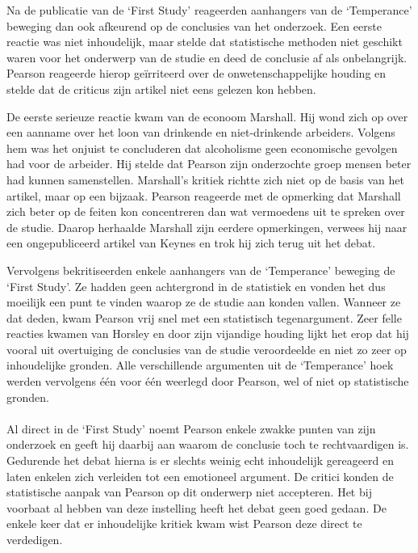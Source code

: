 \documentclass[a4paper,11pt]{article}
\begin{document}
Na de publicatie van de `First Study' reageerden aanhangers van de
`Temperance' beweging dan ook afkeurend op de conclusies van het
onderzoek. Een eerste reactie was niet inhoudelijk, maar stelde dat
statistische methoden niet geschikt waren voor het onderwerp van de studie en
deed de conclusie af als onbelangrijk. Pearson reageerde hierop ge\"irriteerd
over de onwetenschappelijke houding en stelde dat de criticus zijn artikel
niet eens gelezen kon hebben.

De eerste serieuze reactie kwam van de econoom Marshall. Hij wond zich op over
een aanname over het loon van drinkende en niet-drinkende arbeiders. Volgens
hem was het onjuist te concluderen dat alcoholisme geen economische gevolgen
had voor de arbeider. Hij stelde dat Pearson zijn onderzochte groep mensen
beter had kunnen samenstellen. Marshall's kritiek richtte zich niet op de
basis van het artikel, maar op een bijzaak. Pearson reageerde met de opmerking
dat Marshall zich beter op de feiten kon concentreren dan wat vermoedens uit
te spreken over de studie. Daarop herhaalde Marshall zijn eerdere opmerkingen,
verwees hij naar een ongepubliceerd artikel van Keynes en trok hij zich terug
uit het debat.

Vervolgens bekritiseerden enkele aanhangers van de `Temperance' beweging de
`First Study'. Ze hadden geen achtergrond in de statistiek en vonden het dus
moeilijk een punt te vinden waarop ze de studie aan konden vallen. Wanneer ze
dat deden, kwam Pearson vrij snel met een statistisch tegenargument. Zeer
felle reacties kwamen van Horsley en door zijn vijandige houding lijkt het
erop dat hij vooral uit overtuiging de conclusies van de studie veroordeelde
en niet zo zeer op inhoudelijke gronden. Alle verschillende argumenten uit de
`Temperance' hoek werden vervolgens \'e\'en voor \'e\'en weerlegd door
Pearson, wel of niet op statistische gronden.

\paragraph{}

Al direct in de `First Study' noemt Pearson enkele zwakke punten van zijn
onderzoek en geeft hij daarbij aan waarom de conclusie toch te rechtvaardigen
is. Gedurende het debat hierna is er slechts weinig echt inhoudelijk
gereageerd en laten enkelen zich verleiden tot een emotioneel argument. De
critici konden de statistische aanpak van Pearson op dit onderwerp niet
accepteren. Het bij voorbaat al hebben van deze instelling heeft het debat
geen goed gedaan. De enkele keer dat er inhoudelijke kritiek kwam wist Pearson
deze direct te verdedigen.
\end{document}
